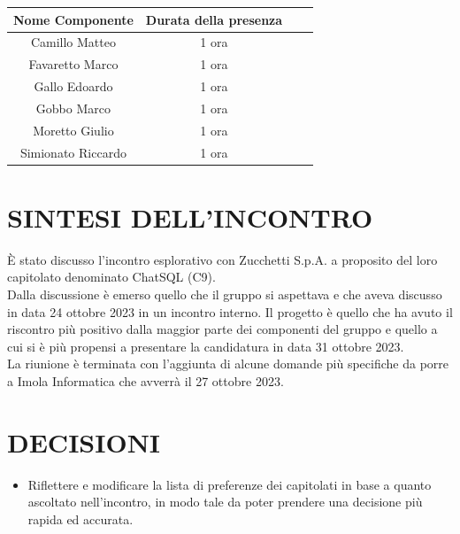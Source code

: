 \documentclass[5pt]{article}
\begin{document}
\begin{table}[ht]
  \begin{tabular}{|Sc|Sc|}
    \hline
    \textbf{Nome Componente} & \textbf{Durata della presenza} \\
    \hline
    Camillo Matteo & 1 ora \\
    Favaretto Marco & 1 ora \\
    Gallo Edoardo & 1 ora \\
    Gobbo Marco & 1 ora \\
    Moretto Giulio & 1 ora \\
    Simionato Riccardo & 1 ora \\
    \hline
  \end{tabular}
  \label{tab:conference}
\end{table}

\section{SINTESI DELL'INCONTRO}

È stato discusso l’incontro esplorativo con Zucchetti S.p.A. a proposito del loro capitolato denominato ChatSQL (C9).\\ 
Dalla discussione è emerso quello che il gruppo si aspettava e che aveva discusso in data 24 ottobre 2023 in un incontro interno. Il progetto è quello che ha avuto il riscontro più positivo dalla maggior parte dei componenti del gruppo e quello a cui si è più propensi a presentare la candidatura in data 31 ottobre 2023.\\

\medskip
\noindent La riunione è terminata con l’aggiunta di alcune domande più specifiche da porre a Imola Informatica che avverrà il 27 ottobre 2023.\\

\section{DECISIONI}
\begin{itemize}
    \item Riflettere e modificare la lista di preferenze dei capitolati in base a quanto ascoltato nell’incontro, in modo tale da poter prendere una decisione più rapida ed accurata.
\end{itemize}
\end{document}
